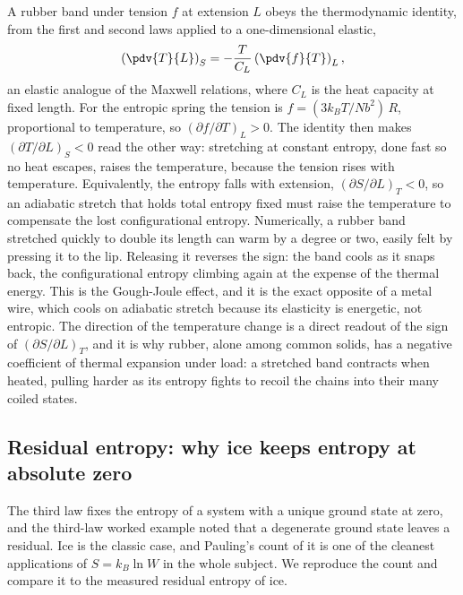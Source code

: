 A rubber band under tension $f$ at extension $L$ obeys the thermodynamic
identity, from the first and second laws applied to a one-dimensional elastic,
\[
\left(\pdv{T}{L}\right)_S = -\frac{T}{C_L}\left(\pdv{f}{T}\right)_L,
\]
an elastic analogue of the Maxwell relations, where $C_L$ is the heat capacity
at fixed length. For the entropic spring the tension is $f = (3 k_B T/N b^2)\,R$,
proportional to temperature, so $(\partial f/\partial T)_L > 0$. The identity
then makes $(\partial T/\partial L)_S < 0$ read the other way: stretching at
constant entropy, done fast so no heat escapes, raises the temperature, because
the tension rises with temperature. Equivalently, the entropy falls with
extension, $(\partial S/\partial L)_T < 0$, so an adiabatic stretch that holds
total entropy fixed must raise the temperature to compensate the lost
configurational entropy. Numerically, a rubber band stretched quickly to double
its length can warm by a degree or two, easily felt by pressing it to the lip.
Releasing it reverses the sign: the band cools as it snaps back, the
configurational entropy climbing again at the expense of the thermal energy.
This is the Gough-Joule effect, and it is the exact opposite of a metal wire,
which cools on adiabatic stretch because its elasticity is energetic, not
entropic. The direction of the temperature change is a direct readout of the
sign of $(\partial S/\partial L)_T$, and it is why rubber, alone among common
solids, has a negative coefficient of thermal expansion under load: a stretched
band contracts when heated, pulling harder as its entropy fights to recoil the
chains into their many coiled states.

\subsection{Residual entropy: why ice keeps entropy at absolute zero}

The third law fixes the entropy of a system with a unique ground state at zero,
and the third-law worked example noted that a degenerate ground state leaves a
residual. Ice is the classic case, and Pauling's count of it is one of the
cleanest applications of $S = k_B \ln W$ in the whole subject. We reproduce the
count and compare it to the measured residual entropy of ice.


